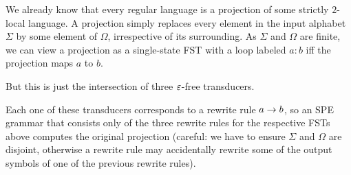 We already know that every regular language is a projection of some strictly $2$-local language.
A projection simply replaces every element in the input alphabet $\Sigma$ by some element of $\Omega$, irrespective of its surrounding.
As $\Sigma$ and $\Omega$ are finite, we can view a projection as a single-state FST with a loop labeled $a:b$ iff the projection maps $a$ to $b$.
%
\begin{center}
        
\end{center}
%
But this is just the intersection of three $\varepsilon$-free transducers.
%
\begin{center}
        
    \hspace{2em}
        
    \hspace{2em}
        
\end{center}
%
Each one of these transducers corresponds to a rewrite rule $a \rightarrow b$, so an SPE grammar that consists only of the three rewrite rules for the respective FSTs above computes the original projection (careful: we have to ensure $\Sigma$ and $\Omega$ are disjoint, otherwise a rewrite rule may accidentally rewrite some of the output symbols of one of the previous rewrite rules).
%
